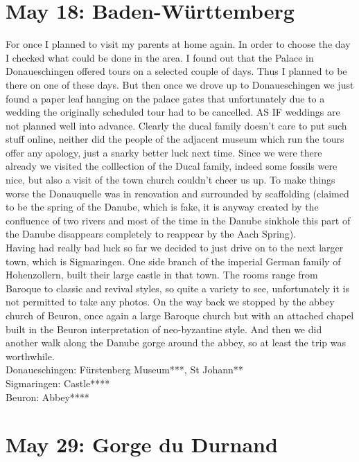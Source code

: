 \section{May 18: Baden-W\"urttemberg}
\label{Donaueschingen2014}

For once I planned to visit my parents at home again. In order to choose the day I checked what could be done in the area. I found out that the Palace in Donaueschingen offered tours on a selected couple of days. Thus I planned to be there on one of these days. But then once we drove up to Donaueschingen we just found a paper leaf hanging on the palace gates that unfortunately due to a wedding the originally scheduled tour had to be cancelled. AS IF weddings are not planned well into advance. Clearly the ducal family doesn't care to put such stuff online, neither did the people of the adjacent museum which run the tours offer any apology, just a snarky better luck next time. Since we were there already we visited the colllection of the Ducal family, indeed some fossils were nice, but also a visit of the town church couldn't cheer us up. To make things worse the Donauquelle was in renovation and surrounded by scaffolding (claimed to be the spring of the Danube, which is fake, it is anyway created by the confluence of two rivers and most of the time in the Danube sinkhole this part of the Danube disappears completely to reappear by the Aach Spring). \\
Having had really bad luck so far we decided to just drive on to the next larger town, which is Sigmaringen. One side branch of the imperial German family of Hohenzollern, built their large castle in that town. The rooms range from Baroque to classic and revival styles, so quite a variety to see, unfortunately it is not permitted to take any photos. On the way back we stopped by the abbey church of Beuron, once again a large Baroque church but with an attached chapel built in the Beuron interpretation of neo-byzantine style. And then we did another walk along the Danube gorge around the abbey, so at least the trip was worthwhile.\\

Donaueschingen: F\"urstenberg Museum***, St Johann**\\
Sigmaringen: Castle****\\
Beuron: Abbey****

\section{May 29: Gorge du Durnand}
\label{Durnand2014}

